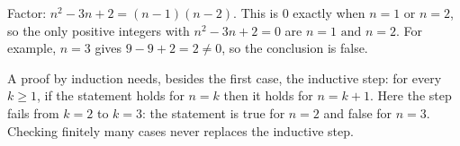 Factor: $n^2-3n+2=(n-1)(n-2)$. This is $0$ exactly when $n=1$ or $n=2$, so the only positive integers with $n^2-3n+2=0$ are $\boxed{n=1\text{ and }n=2}$. For example, $n=3$ gives $9-9+2=2\ne0$, so the conclusion is false.

A proof by induction needs, besides the first case, the inductive step: for every $k\ge1$, if the statement holds for $n=k$ then it holds for $n=k+1$. Here the step fails from $k=2$ to $k=3$: the statement is true for $n=2$ and false for $n=3$. Checking finitely many cases never replaces the inductive step.
